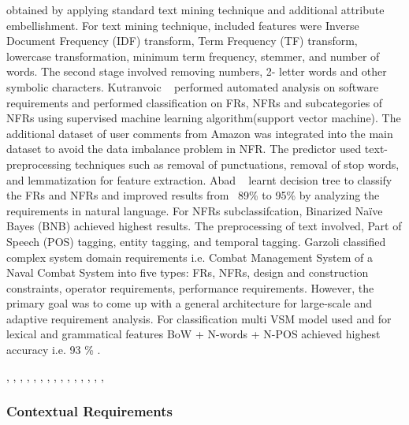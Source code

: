 obtained by applying standard text mining technique and additional attribute
embellishment. For text mining technique, included features were Inverse
Document Frequency (IDF) transform, Term Frequency (TF) transform, lowercase
transformation, minimum term frequency, stemmer, and number of words. The second
stage involved removing numbers, 2- letter words and other symbolic characters.
Kutranvoic \etal ~ \cite {Kurtanovic:2017}performed automated analysis on
software requirements and performed classification on FRs, NFRs and
subcategories of NFRs using supervised machine learning algorithm(support vector
machine). The additional dataset of user comments from Amazon was integrated
into the main dataset to avoid the data imbalance problem in NFR. The predictor
used text-preprocessing techniques such as removal of punctuations, removal of
stop words, and lemmatization for feature extraction. Abad \etal ~
\cite{Abad:2017} learnt decision tree to classify the FRs and NFRs and improved
results from ~89\% to 95\% by analyzing the requirements in natural language.
For NFRs subclassifcation, Binarized Naïve Bayes (BNB) achieved highest results.
The preprocessing of text involved, Part of Speech (POS) tagging, entity
tagging, and temporal tagging. Garzoli \cite {Garzoli:2013} classified complex
system domain requirements i.e. Combat Management System of a Naval Combat
System into five types: FRs, NFRs, design and construction constraints, operator
requirements, performance requirements. However, the primary goal was to come up
with a general architecture for large-scale and adaptive requirement analysis.
For classification multi VSM model used and for lexical and grammatical features
BoW + N-words + N-POS achieved highest accuracy i.e. 93 \% .



\cite{Deocadez:2017}, \cite{Kurtanovic:2017}, \cite{Guzman:2017},
\cite{Abad:2017}, \cite{Dekhtyar:2017}, \cite{Rashwan:2012}, \cite{Lu:2017},
\cite{Hayes:2014}, \cite{Williams:2017}, \cite{Garzoli:2013},
\cite{Casamayor:2010}, \cite{Wang:2016}, \cite{Hussain:2012}, \cite{Jiang:2014},
\cite{Jha:2017}, \cite{Pinquie:2015}



\subsubsection{Contextual Requirements} 

